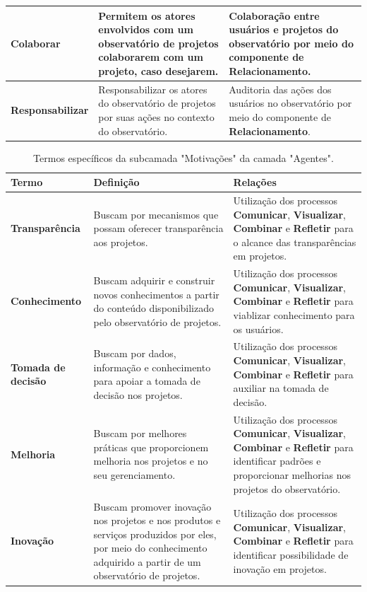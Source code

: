 \begin{apendicesenv}
\begin{table}[H]
\begin{tabularx}{\textwidth}{|l|X|X|}
\textbf{Colaborar}   & Permitem os atores envolvidos com um observatório de projetos colaborarem com um projeto, caso desejarem. & Colaboração entre usuários e projetos do observatório por meio do componente de \textbf{Relacionamento}. \\ \hline
\textbf{Responsabilizar}   & Responsabilizar os atores do observatório de projetos por suas ações no contexto do observatório. & Auditoria das ações dos usuários no observatório por meio do componente de \textbf{Relacionamento}. \\ \hline
\end{tabularx}
\end{table}

\begin{table}[H]
\centering
\caption{Termos específicos da subcamada "Motivações" da camada "Agentes".}
\begin{tabularx}{\textwidth}{|l|X|X|}
\hline
\textbf{Termo} & \textbf{Definição} & \textbf{Relações} \\ \hline
\textbf{Transparência} & Buscam por mecanismos que possam oferecer transparência aos projetos. & Utilização dos processos \textbf{Comunicar}, \textbf{Visualizar}, \textbf{Combinar} e \textbf{Refletir} para o alcance das transparências em projetos. \\ \hline
\textbf{Conhecimento}  & Buscam adquirir e construir novos conhecimentos a partir do conteúdo disponibilizado pelo observatório de projetos.
 & Utilização dos processos \textbf{Comunicar}, \textbf{Visualizar}, \textbf{Combinar} e \textbf{Refletir} para viablizar conhecimento para os usuários. \\ \hline
\textbf{Tomada de decisão}  & Buscam por dados, informação e conhecimento para apoiar a tomada de decisão nos projetos. & Utilização dos processos \textbf{Comunicar}, \textbf{Visualizar}, \textbf{Combinar} e \textbf{Refletir} para auxiliar na tomada de decisão. \\ \hline
\textbf{Melhoria}   & Buscam por melhores práticas que proporcionem melhoria nos projetos e no seu gerenciamento. & Utilização dos processos \textbf{Comunicar}, \textbf{Visualizar}, \textbf{Combinar} e \textbf{Refletir} para identificar padrões e proporcionar melhorias nos projetos do observatório. \\ \hline
\textbf{Inovação}  & Buscam promover inovação nos projetos e nos produtos e serviços produzidos por eles,
por meio do conhecimento adquirido a partir de um observatório de projetos.
 & Utilização dos processos \textbf{Comunicar}, \textbf{Visualizar}, \textbf{Combinar} e \textbf{Refletir} para identificar possibilidade de inovação em projetos.\\ \hline

\end{tabularx}
\end{table}
\end{apendicesenv}
